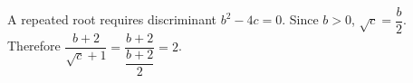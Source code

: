 A repeated root requires discriminant $b^2-4c=0$. Since $b>0$, $\sqrt c=\dfrac{b}{2}$. Therefore $\dfrac{b+2}{\sqrt c+1}=\dfrac{b+2}{\dfrac{b+2}{2}}=\boxed2$.
